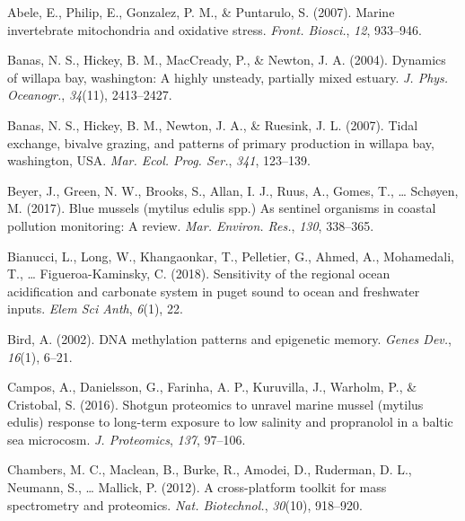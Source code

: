 \documentclass [11pt, proquest] {uwthesis}[2015/03/03]
\newlength{\cslhangindent}
\newenvironment{CSLReferences}%
{\setlength{\parindent}{0pt}%
\everypar{\setlength{\hangindent}{\cslhangindent}}\ignorespaces}%
{\par}
\begin{document}

\noindent

\setlength{\parindent}{-0.20in}
\setlength{\leftskip}{0.20in}
\setlength{\parskip}{8pt}

\hypertarget{refs}{}
\begin{CSLReferences}{1}{0}
\leavevmode\hypertarget{ref-Abele2007}{}%
Abele, E., Philip, E., Gonzalez, P. M., \& Puntarulo, S. (2007). Marine invertebrate mitochondria and oxidative stress. \emph{Front. Biosci.}, \emph{12}, 933--946.

\leavevmode\hypertarget{ref-Banas2004}{}%
Banas, N. S., Hickey, B. M., MacCready, P., \& Newton, J. A. (2004). Dynamics of willapa bay, washington: A highly unsteady, partially mixed estuary. \emph{J. Phys. Oceanogr.}, \emph{34}(11), 2413--2427.

\leavevmode\hypertarget{ref-Banas2007}{}%
Banas, N. S., Hickey, B. M., Newton, J. A., \& Ruesink, J. L. (2007). Tidal exchange, bivalve grazing, and patterns of primary production in willapa bay, washington, {USA}. \emph{Mar. Ecol. Prog. Ser.}, \emph{341}, 123--139.

\leavevmode\hypertarget{ref-Beyer2017}{}%
Beyer, J., Green, N. W., Brooks, S., Allan, I. J., Ruus, A., Gomes, T., \ldots{} Schøyen, M. (2017). Blue mussels (mytilus edulis spp.) As sentinel organisms in coastal pollution monitoring: A review. \emph{Mar. Environ. Res.}, \emph{130}, 338--365.

\leavevmode\hypertarget{ref-Bianucci2018}{}%
Bianucci, L., Long, W., Khangaonkar, T., Pelletier, G., Ahmed, A., Mohamedali, T., \ldots{} Figueroa-Kaminsky, C. (2018). Sensitivity of the regional ocean acidification and carbonate system in puget sound to ocean and freshwater inputs. \emph{Elem Sci Anth}, \emph{6}(1), 22.

\leavevmode\hypertarget{ref-Bird2002}{}%
Bird, A. (2002). {DNA} methylation patterns and epigenetic memory. \emph{Genes Dev.}, \emph{16}(1), 6--21.

\leavevmode\hypertarget{ref-Campos2016}{}%
Campos, A., Danielsson, G., Farinha, A. P., Kuruvilla, J., Warholm, P., \& Cristobal, S. (2016). Shotgun proteomics to unravel marine mussel (mytilus edulis) response to long-term exposure to low salinity and propranolol in a baltic sea microcosm. \emph{J. Proteomics}, \emph{137}, 97--106.

\leavevmode\hypertarget{ref-Chambers2012}{}%
Chambers, M. C., Maclean, B., Burke, R., Amodei, D., Ruderman, D. L., Neumann, S., \ldots{} Mallick, P. (2012). A cross-platform toolkit for mass spectrometry and proteomics. \emph{Nat. Biotechnol.}, \emph{30}(10), 918--920.


\end{CSLReferences}
\end{document}
